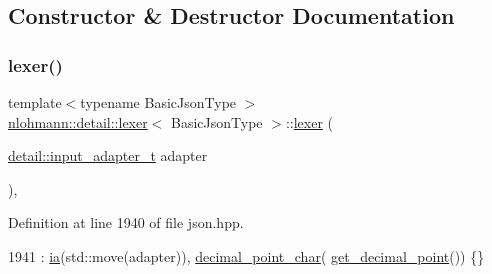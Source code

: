 \subsection{Constructor \& Destructor Documentation}
\mbox{\label{classnlohmann_1_1detail_1_1lexer_a0d7de7b99bc839ea9a39dd738d05d89c}} 
\subsubsection{\texorpdfstring{lexer()}{lexer()}\hspace{0.1cm}{\footnotesize\ttfamily [1/2]}}
{\footnotesize\ttfamily template$<$typename Basic\+Json\+Type $>$ \\
\hyperlink{classnlohmann_1_1detail_1_1lexer}{nlohmann\+::detail\+::lexer}$<$ Basic\+Json\+Type $>$\+::\hyperlink{classnlohmann_1_1detail_1_1lexer}{lexer} (\begin{DoxyParamCaption}\item[{\hyperlink{namespacenlohmann_1_1detail_ae132f8cd5bb24c5e9b40ad0eafedf1c2}{detail\+::input\+\_\+adapter\+\_\+t}}]{adapter }\end{DoxyParamCaption})\hspace{0.3cm}{\ttfamily [inline]}, {\ttfamily [explicit]}}



Definition at line 1940 of file json.\+hpp.


\begin{DoxyCode}
1941         : \hyperlink{classnlohmann_1_1detail_1_1lexer_aa7e69cd9d51451fd798eaf501b40421f}{ia}(std::move(adapter)), \hyperlink{classnlohmann_1_1detail_1_1lexer_a16593b0475f6d1cddd5eaf7c045771f3}{decimal\_point\_char}(
      \hyperlink{classnlohmann_1_1detail_1_1lexer_ae545b0856f57220645d749ab8c494f47}{get\_decimal\_point}()) \{\}
\end{DoxyCode}
\mbox{\label{classnlohmann_1_1detail_1_1lexer_a2e8ce2a0d266d148b69dfbcc2e4ad71a}} 
